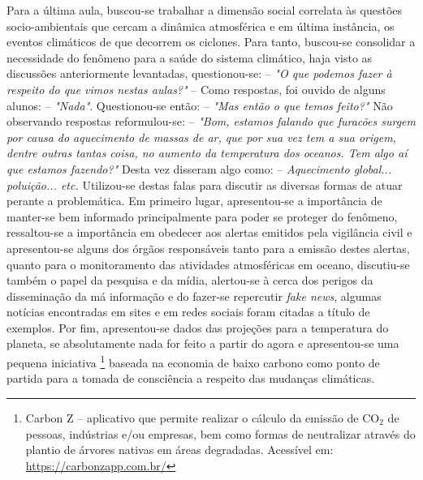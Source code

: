 Para a última aula, buscou-se trabalhar a dimensão social correlata às questões socio-ambientais que cercam a dinâmica atmosférica e em última instância, os eventos climáticos de que decorrem os ciclones. Para tanto, buscou-se consolidar a necessidade do fenômeno para a saúde do sistema climático, haja visto as discussões anteriormente levantadas, questionou-se: -- \textit{"O que podemos fazer à respeito do que vimos nestas aulas?"} -- Como respostas, foi ouvido de alguns alunos: -- \textit{"Nada"}. Questionou-se então: -- \textit{"Mas então o que temos feito?"} Não observando respostas reformulou-se: -- \textit{"Bom, estamos falando que furacões surgem por causa do aquecimento de massas de ar, que por sua vez tem a sua origem, dentre outras tantas coisa, no aumento da temperatura dos oceanos. Tem algo aí que estamos fazendo?"} Desta vez disseram algo como: -- \textit{Aquecimento global... poluição... etc.} Utilizou-se destas falas para discutir as diversas formas de atuar perante a problemática. Em primeiro lugar, apresentou-se a importância de manter-se bem informado principalmente para poder se proteger do fenômeno, ressaltou-se a importância em obedecer aos alertas emitidos pela vigilância civil e apresentou-se alguns dos órgãos responsáveis tanto para a emissão destes alertas, quanto para o monitoramento das atividades atmosféricas em oceano, discutiu-se também o papel da pesquisa e da mídia, alertou-se à cerca dos perigos da disseminação da má informação e do fazer-se repercutir \textit{fake news}, algumas notícias encontradas em sites e em redes sociais foram citadas a título de exemplos. Por fim, apresentou-se dados das projeções para a temperatura do planeta, se absolutamente nada for feito a partir do agora e apresentou-se uma pequena iniciativa \footnote{Carbon Z -- aplicativo que permite realizar o cálculo da emissão de $\text{CO}_{2}$ de pessoas, indústrias e/ou empresas, bem como formas de neutralizar através do plantio de árvores nativas em áreas degradadas. Acessível em: \url{https://carbonzapp.com.br/}} baseada na economia de baixo carbono como ponto de partida para a tomada de consciência a respeito das mudanças climáticas.


